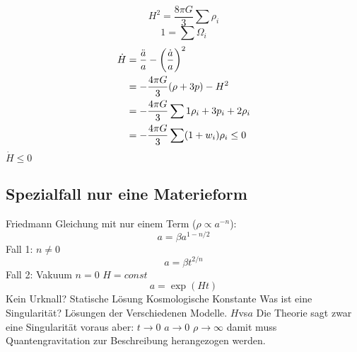 \documentclass[10pt,oneside,a4paper]{scrartcl}
\let\originalleft\left  %
\let\originalright\right
\renewcommand{\left}{\mathopen{}\mathclose\bgroup\originalleft}
\renewcommand{\right}{\aftergroup\egroup\originalright}
\theoremstyle{definition}
\theoremstyle{remark}
\begin{document}
\begin{equation}
H^2=\frac{8\pi G}{3}\sum \rho_i
\end{equation}
\begin{equation}
1=\sum \Omega_i
\end{equation}
\begin{equation}
\begin{split}
\dot{H}&=\frac{\ddot{a}}{a}-\left(\frac{\dot{a}}{a}\right)^2\\
&=-\frac{4\pi G}{3}\left(\rho+3p\right)-H^2\\
&=-\frac{4\pi G}{3}\sum 1\rho_i+3p_i+2\rho_i\\
&=-\frac{4\pi G}{3}\sum \left(1+w_i\right)\rho_i\leq 0\\
\end{split}
\end{equation}
$\dot{H}\leq 0$ 
\subsection{Spezialfall nur eine Materieform}
Friedmann Gleichung mit nur einem Term ($\rho\propto a^{-n}$):
\begin{equation}
a=\beta a^{1-n/2}
\end{equation}
Fall 1: $n\neq 0$
\begin{equation}
a=\beta t^{2/n}
\end{equation}
Fall 2: Vakuum $n =0$  $H=const$
\begin{equation}
a=\exp(Ht)
\end{equation}
Kein Urknall?
Statische Lösung
Kosmologische Konstante 
Was ist eine Singularität?
Lösungen der Verschiedenen Modelle.
$H$vs$a$
Die Theorie sagt zwar eine Singularität voraus aber: $t\to 0$ $a\to 0$
$\rho\to\infty$ damit muss Quantengravitation zur Beschreibung herangezogen
werden.
\end{document}
